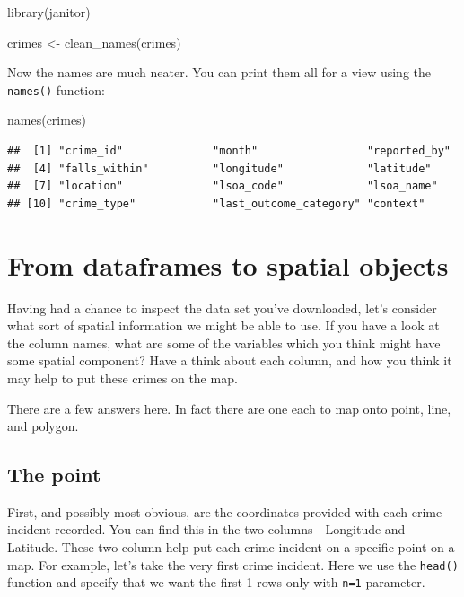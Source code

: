\documentclass[
]{book}
\makeatletter
\newenvironment{Shaded}{\begin{snugshade}}{\end{snugshade}}
\newcommand{\FunctionTok}[1]{\textcolor[rgb]{0,0,0}{#1}}
\newcommand{\NormalTok}[1]{#1}
\newcommand{\OtherTok}[1]{\textcolor[rgb]{0.37,0.37,0.37}{#1}}
\newenvironment{kframe}{%
\medskip{}
\setlength{\fboxsep}{.8em}
 \def\at@end@of@kframe{}%
 \ifinner\ifhmode%
  \def\at@end@of@kframe{\end{minipage}}%
  \begin{minipage}{\columnwidth}%
 \fi\fi%
 \def\FrameCommand##1{\hskip\@totalleftmargin \hskip-\fboxsep
 \colorbox{shadecolor}{##1}\hskip-\fboxsep
     \hskip-\linewidth \hskip-\@totalleftmargin \hskip\columnwidth}%
 \MakeFramed {\advance\hsize-\width
   \@totalleftmargin\z@ \linewidth\hsize
   \@setminipage}}%
 {\par\unskip\endMakeFramed%
 \at@end@of@kframe}
\renewenvironment{Shaded}{\begin{kframe}}{\end{kframe}}
\makeatother
\begin{document}
\begin{Shaded}
\begin{Highlighting}[]
\FunctionTok{library}\NormalTok{(janitor)}

\NormalTok{crimes }\OtherTok{\textless{}{-}} \FunctionTok{clean\_names}\NormalTok{(crimes)}
\end{Highlighting}
\end{Shaded}

Now the names are much neater. You can print them all for a view using the \texttt{names()} function:

\begin{Shaded}
\begin{Highlighting}[]
\FunctionTok{names}\NormalTok{(crimes)}
\end{Highlighting}
\end{Shaded}

\begin{verbatim}
##  [1] "crime_id"              "month"                 "reported_by"          
##  [4] "falls_within"          "longitude"             "latitude"             
##  [7] "location"              "lsoa_code"             "lsoa_name"            
## [10] "crime_type"            "last_outcome_category" "context"
\end{verbatim}

\hypertarget{from-dataframes-to-spatial-objects}{%
\section{From dataframes to spatial objects}\label{from-dataframes-to-spatial-objects}}

Having had a chance to inspect the data set you've downloaded, let's consider what sort of spatial information we might be able to use. If you have a look at the column names, what are some of the variables which you think might have some spatial component? Have a think about each column, and how you think it may help to put these crimes on the map.

There are a few answers here. In fact there are one each to map onto point, line, and polygon.

\hypertarget{the-point}{%
\subsection{The point}\label{the-point}}

First, and possibly most obvious, are the coordinates provided with each crime incident recorded. You can find this in the two columns - Longitude and Latitude. These two column help put each crime incident on a specific point on a map. For example, let's take the very first crime incident. Here we use the \texttt{head()} function and specify that we want the first 1 rows only with \texttt{n=1} parameter.
\end{document}
